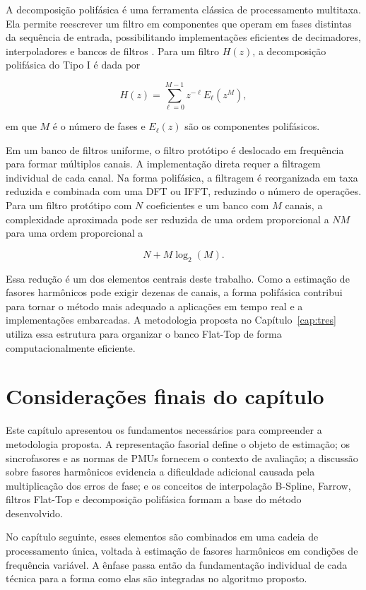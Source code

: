 A decomposição polifásica é uma ferramenta clássica de processamento multitaxa. Ela permite reescrever um filtro em componentes que operam em fases distintas da sequência de entrada, possibilitando implementações eficientes de decimadores, interpoladores e bancos de filtros \cite{mk06}. Para um filtro $H(z)$, a decomposição polifásica do Tipo I é dada por

\begin{equation}
H(z) = \sum_{\ell=0}^{M-1} z^{-\ell}E_{\ell}(z^M),
\label{eq:cap2_polifasica}
\end{equation}

\noindent em que $M$ é o número de fases e $E_{\ell}(z)$ são os componentes polifásicos.

Em um banco de filtros uniforme, o filtro protótipo é deslocado em frequência para formar múltiplos canais. A implementação direta requer a filtragem individual de cada canal. Na forma polifásica, a filtragem é reorganizada em taxa reduzida e combinada com uma DFT ou IFFT, reduzindo o número de operações. Para um filtro protótipo com $N$ coeficientes e um banco com $M$ canais, a complexidade aproximada pode ser reduzida de uma ordem proporcional a $NM$ para uma ordem proporcional a

\begin{equation}
N + M\log_2(M).
\label{eq:cap2_complexidade}
\end{equation}

Essa redução é um dos elementos centrais deste trabalho. Como a estimação de fasores harmônicos pode exigir dezenas de canais, a forma polifásica contribui para tornar o método mais adequado a aplicações em tempo real e a implementações embarcadas. A metodologia proposta no Capítulo~\ref{cap:tres} utiliza essa estrutura para organizar o banco Flat-Top de forma computacionalmente eficiente.

\section{Considerações finais do capítulo}

Este capítulo apresentou os fundamentos necessários para compreender a metodologia proposta. A representação fasorial define o objeto de estimação; os sincrofasores e as normas de PMUs fornecem o contexto de avaliação; a discussão sobre fasores harmônicos evidencia a dificuldade adicional causada pela multiplicação dos erros de fase; e os conceitos de interpolação B-Spline, Farrow, filtros Flat-Top e decomposição polifásica formam a base do método desenvolvido.

No capítulo seguinte, esses elementos são combinados em uma cadeia de processamento única, voltada à estimação de fasores harmônicos em condições de frequência variável. A ênfase passa então da fundamentação individual de cada técnica para a forma como elas são integradas no algoritmo proposto.
